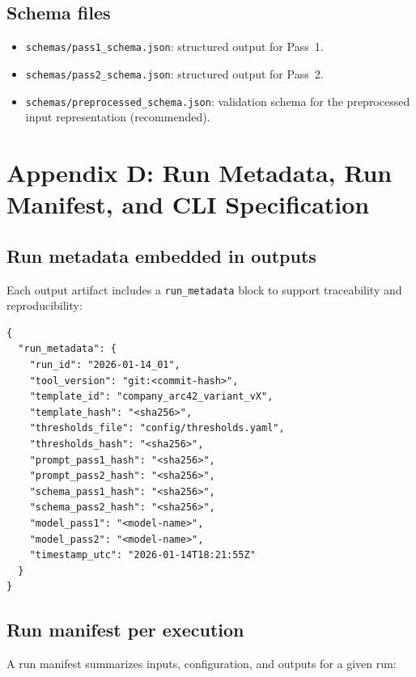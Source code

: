 \subsection{Schema files}
\begin{itemize}
    \item \texttt{schemas/pass1\_schema.json}: structured output for Pass~1.
    \item \texttt{schemas/pass2\_schema.json}: structured output for Pass~2.
    \item \texttt{schemas/preprocessed\_schema.json}: validation schema for the preprocessed input representation (recommended).
\end{itemize}


\section{Appendix D: Run Metadata, Run Manifest, and CLI Specification}
\label{app:run_metadata_cli}

\subsection{Run metadata embedded in outputs}
Each output artifact includes a \texttt{run\_metadata} block to support traceability and reproducibility:

\begin{verbatim}
{
  "run_metadata": {
    "run_id": "2026-01-14_01",
    "tool_version": "git:<commit-hash>",
    "template_id": "company_arc42_variant_vX",
    "template_hash": "<sha256>",
    "thresholds_file": "config/thresholds.yaml",
    "thresholds_hash": "<sha256>",
    "prompt_pass1_hash": "<sha256>",
    "prompt_pass2_hash": "<sha256>",
    "schema_pass1_hash": "<sha256>",
    "schema_pass2_hash": "<sha256>",
    "model_pass1": "<model-name>",
    "model_pass2": "<model-name>",
    "timestamp_utc": "2026-01-14T18:21:55Z"
  }
}
\end{verbatim}

\subsection{Run manifest per execution}
A run manifest summarizes inputs, configuration, and outputs for a given run:

